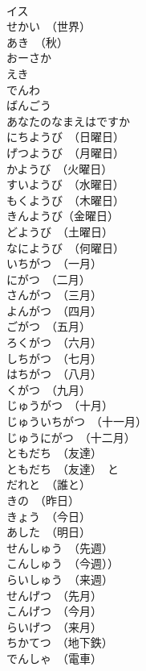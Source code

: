 \documentclass[8pt]{extreport}
\begin{document}
\begin{CJK}{UTF8}{min}
\\	イス	
\\	せかい　（世界）	
\\	あき　（秋）	
\\	おーさか	
\\	えき	
\\	でんわ	
\\	ばんごう	
\\	あなたのなまえはですか	
\\	にちようび　（日曜日）	
\\	げつようび　（月曜日）	
\\	かようび　（火曜日）	
\\	すいようび　（水曜日）	
\\	もくようび　（木曜日）	
\\	きんようび（金曜日）	
\\	どようび　（土曜日）	
\\	なにようび　（何曜日）	
\\	いちがつ　（一月）	
\\	にがつ　（二月）	
\\	さんがつ　（三月）	
\\	よんがつ　（四月）	
\\	ごがつ　（五月）	
\\	ろくがつ　（六月）	
\\	しちがつ　（七月）	
\\	はちがつ　（八月）	
\\	くがつ　（九月）	
\\	じゅうがつ　（十月）	
\\	じゅういちがつ　（十一月）	
\\	じゅうにがつ　（十二月）	
\\	ともだち　（友達）	
\\	ともだち　（友達）　と	
\\	だれと　（誰と）	
\\	きの　（昨日）	
\\	きょう　（今日）	
\\	あした　（明日）	
\\	せんしゅう　（先週）	
\\	こんしゅう　（今週））	
\\	らいしゅう　（来週）	
\\	せんげつ　（先月）	
\\	こんげつ　（今月）	
\\	らいげつ　（来月）	
\\	ちかてつ　（地下鉄）	
\\	でんしゃ　（電車）	

\end{CJK}
\end{document}
